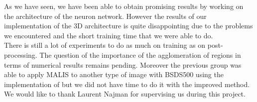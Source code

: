 As we have seen, we have been able to obtain promising results by working on the architecture of the neuron network. However the results of our implementation of the 3D architecture is quite disappointing due to the problems we encountered and the short training time that we were able to do.\\

There is still a lot of experiments to do as much on training as on post-processing. The question of the importance of the agglomeration of regions in terms of numerical results remains pending. Moreover the previous group was able to apply MALIS to another type of image with BSDS500 using the implementation of \cite{turaga_maximin_2009} but we did not have time to do it with the improved method.\\

We  would  like  to  thank  Laurent  Najman  for  supervising  us  during  this  project.